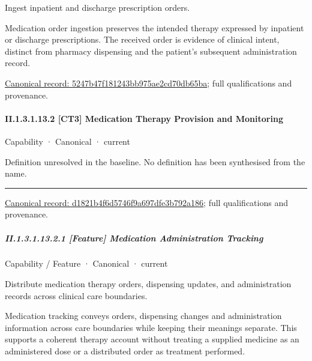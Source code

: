 Ingest inpatient and discharge prescription orders.



Medication order ingestion preserves the intended therapy expressed by inpatient or discharge prescriptions. The received order is evidence of clinical intent, distinct from pharmacy dispensing and the patient's subsequent administration record.


{\footnotesize \href{../../../../../../../continuum/strategy/capability/feature/5247b47f181243bb975ae2cd70db65ba.md}{Canonical record: 5247b47f181243bb975ae2cd70db65ba}; full qualifications and provenance.}\par
\paragraph*{II.1.3.1.13.2 [CT3] Medication Therapy Provision and Monitoring}
\label{navigation:II.1.3.1.13.2}

\label{element:d1821b4f6d5746f9a697dfe3b792a186}
{\small Capability · Canonical · current}\par

Definition unresolved in the baseline. No definition has been synthesised from the name.



\medskip\hrule\medskip

{\footnotesize \href{../../../../../../../continuum/strategy/capability/d1821b4f6d5746f9a697dfe3b792a186.md}{Canonical record: d1821b4f6d5746f9a697dfe3b792a186}; full qualifications and provenance.}\par
\subparagraph*{II.1.3.1.13.2.1 [Feature] Medication Administration Tracking}
\label{navigation:II.1.3.1.13.2.1}

\label{element:6e01c72ef9c149e2ac231463810c2265}
{\small Capability / Feature · Canonical · current}\par

Distribute medication therapy orders, dispensing updates, and administration records across clinical care boundaries.



Medication tracking conveys orders, dispensing changes and administration information across care boundaries while keeping their meanings separate. This supports a coherent therapy account without treating a supplied medicine as an administered dose or a distributed order as treatment performed.


